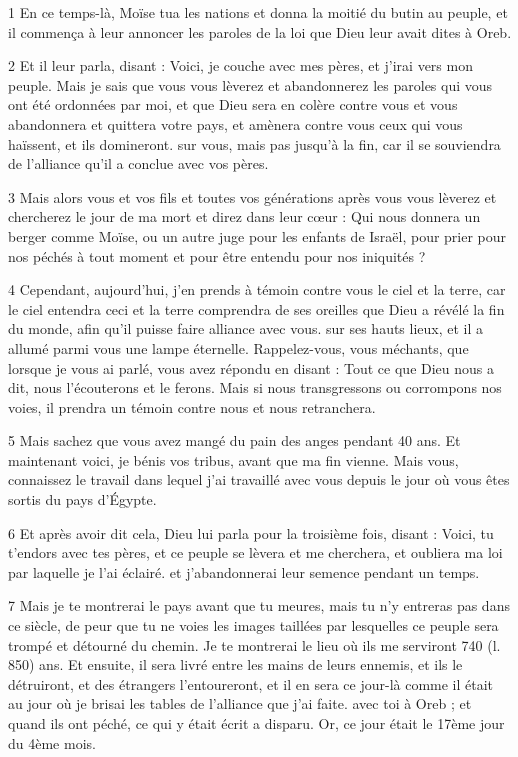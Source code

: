 \par 1 En ce temps-là, Moïse tua les nations et donna la moitié du butin au peuple, et il commença à leur annoncer les paroles de la loi que Dieu leur avait dites à Oreb.

\par 2 Et il leur parla, disant : Voici, je couche avec mes pères, et j'irai vers mon peuple. Mais je sais que vous vous lèverez et abandonnerez les paroles qui vous ont été ordonnées par moi, et que Dieu sera en colère contre vous et vous abandonnera et quittera votre pays, et amènera contre vous ceux qui vous haïssent, et ils domineront. sur vous, mais pas jusqu'à la fin, car il se souviendra de l'alliance qu'il a conclue avec vos pères.

\par 3 Mais alors vous et vos fils et toutes vos générations après vous vous lèverez et chercherez le jour de ma mort et direz dans leur cœur : Qui nous donnera un berger comme Moïse, ou un autre juge pour les enfants de Israël, pour prier pour nos péchés à tout moment et pour être entendu pour nos iniquités ?

\par 4 Cependant, aujourd'hui, j'en prends à témoin contre vous le ciel et la terre, car le ciel entendra ceci et la terre comprendra de ses oreilles que Dieu a révélé la fin du monde, afin qu'il puisse faire alliance avec vous. sur ses hauts lieux, et il a allumé parmi vous une lampe éternelle. Rappelez-vous, vous méchants, que lorsque je vous ai parlé, vous avez répondu en disant : Tout ce que Dieu nous a dit, nous l'écouterons et le ferons. Mais si nous transgressons ou corrompons nos voies, il prendra un témoin contre nous et nous retranchera.

\par 5 Mais sachez que vous avez mangé du pain des anges pendant 40 ans. Et maintenant voici, je bénis vos tribus, avant que ma fin vienne. Mais vous, connaissez le travail dans lequel j'ai travaillé avec vous depuis le jour où vous êtes sortis du pays d'Égypte.

\par 6 Et après avoir dit cela, Dieu lui parla pour la troisième fois, disant : Voici, tu t'endors avec tes pères, et ce peuple se lèvera et me cherchera, et oubliera ma loi par laquelle je l'ai éclairé. et j'abandonnerai leur semence pendant un temps.

\par 7 Mais je te montrerai le pays avant que tu meures, mais tu n'y entreras pas dans ce siècle, de peur que tu ne voies les images taillées par lesquelles ce peuple sera trompé et détourné du chemin. Je te montrerai le lieu où ils me serviront 740 (l. 850) ans. Et ensuite, il sera livré entre les mains de leurs ennemis, et ils le détruiront, et des étrangers l'entoureront, et il en sera ce jour-là comme il était au jour où je brisai les tables de l'alliance que j'ai faite. avec toi à Oreb ; et quand ils ont péché, ce qui y était écrit a disparu. Or, ce jour était le 17ème jour du 4ème mois.

